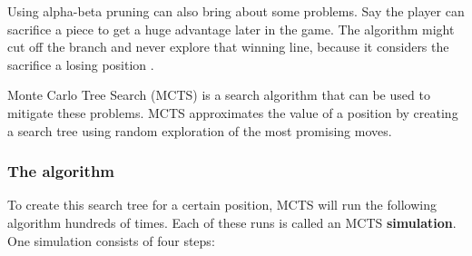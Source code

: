\documentclass{article}
\begin{document}
Using alpha-beta pruning can also bring about some problems. Say the player can sacrifice a piece
to get a huge advantage later in the game. The algorithm might cut off the branch and never explore that winning line, 
because it considers the sacrifice a losing position \cite{MinimaxMonteCarlo}. 

Monte Carlo Tree Search (MCTS) \cite{MonteCarloTree2022} is a search algorithm that can be used to mitigate these problems.
MCTS approximates the value of a position by creating a search tree using random exploration of the most promising moves.

\subsubsection{The algorithm}

To create this search tree for a certain position, MCTS will run the following algorithm hundreds of times. 
Each of these runs is called an MCTS \textbf{simulation}. One simulation consists of four steps:
\end{document}
